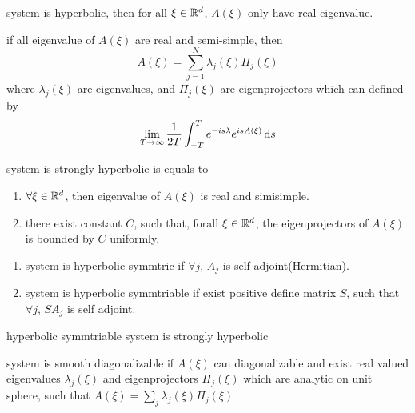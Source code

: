 \documentclass[../main]{subfiles}
\begin{document}
\begin{thm}
    system is hyperbolic, then for all $\xi\in \mathbb{R}^d$, $A(\xi)$ only have real eigenvalue.
\end{thm}

\newpage

\begin{thm}
    if all eigenvalue of $A(\xi)$ are real and semi-simple, then \begin{equation}
        A(\xi)=\sum_{j=1}^N\lambda_j(\xi)\Pi_j(\xi)
    \end{equation}
    where $\lambda_j(\xi)$ are eigenvalues, and $\Pi_j(\xi)$ are eigenprojectors which can defined by \begin{equation}
        \lim_{T\to \infty}\frac{1}{2T}\int_{-T}^Te^{-is\lambda}e^{isA(\xi)}\,\mathrm{d}s
    \end{equation}
\end{thm}
\vspace{3cm}

\begin{thm}
    system is strongly hyperbolic is equals to \begin{enumerate}
        \item $\forall \xi \in \mathbb{R}^d$, then eigenvalue of $A(\xi)$ is real and simisimple.
        \item there exist constant $C$, such that, forall $\xi\in \mathbb{R}^d$, the eigenprojectors of $A(\xi)$ is bounded by $C$ uniformly.
    \end{enumerate}
\end{thm}
\newpage

\begin{defn}
    \begin{enumerate}
        \item system is hyperbolic symmtric if $\forall j$, $A_j$ is self adjoint(Hermitian).
        \item system is hyperbolic symmtriable if exist positive define matrix $S$, such that $\forall j$, $SA_j$ is self adjoint.
    \end{enumerate}
\end{defn}

\begin{thm}
    hyperbolic symmtriable system is strongly hyperbolic
\end{thm}
\newpage

\begin{defn}
    system is smooth diagonalizable if $A(\xi)$ can diagonalizable and exist real valued eigenvalues $\lambda_j(\xi)$ and eigenprojectors $\Pi_j(\xi)$ which are analytic on unit sphere, such that $A(\xi)=\sum_j\lambda_j(\xi)\Pi_j(\xi)$
\end{defn}
\end{document}
